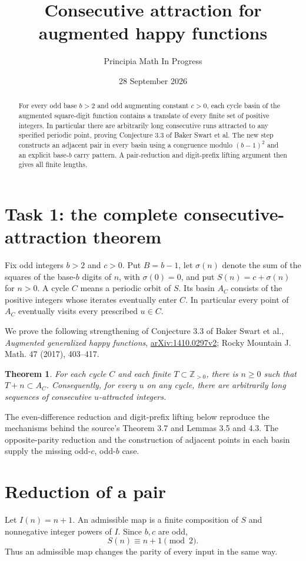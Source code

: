 \documentclass[11pt]{article}
\title{Consecutive attraction for augmented happy functions}
\author{Principia Math In Progress}
\date{28 September 2026}
\newtheorem{theorem}{Theorem}
\begin{document}
\maketitle
\begin{abstract}
For every odd base $b>2$ and odd augmenting constant $c>0$, each cycle
basin of the augmented square-digit function contains a translate of
every finite set of positive integers. In particular there are arbitrarily
long consecutive runs attracted to any specified periodic point, proving
Conjecture 3.3 of Baker Swart et al. The new step constructs an adjacent
pair in every basin using a congruence modulo $(b-1)^2$ and an explicit
base-$b$ carry pattern. A pair-reduction and digit-prefix lifting
argument then gives all finite lengths.
\end{abstract}

\section*{Task 1: the complete consecutive-attraction theorem}

Fix odd integers $b>2$ and $c>0$. Put $B=b-1$, let $\sigma(n)$ denote
the sum of the squares of the base-$b$ digits of $n$, with $\sigma(0)=0$,
and put $S(n)=c+\sigma(n)$ for $n>0$. A cycle $C$ means a periodic orbit
of $S$. Its basin $A_C$ consists of the positive integers whose iterates
eventually enter $C$. In particular every point of $A_C$ eventually
visits every prescribed $u\in C$.

We prove the following strengthening of Conjecture 3.3 of Baker Swart
et al., \emph{Augmented generalized happy functions},
\href{https://arxiv.org/abs/1410.0297}{arXiv:1410.0297v2}; Rocky Mountain
J. Math. 47 (2017), 403--417.
\begin{theorem}
For each cycle $C$ and each finite $T\subset\mathbb Z_{>0}$, there is
$n\ge0$ such that $T+n\subset A_C$. Consequently, for every $u$ on any
cycle, there are arbitrarily long sequences of consecutive $u$-attracted
integers.
\end{theorem}
The even-difference reduction and digit-prefix lifting below reproduce
the mechanisms behind the source's Theorem 3.7 and Lemmas 3.5 and 4.3.
The opposite-parity reduction and the construction of adjacent points
in each basin supply the missing odd-$c$, odd-$b$ case.

\section*{Reduction of a pair}
Let $I(n)=n+1$. An admissible map is a finite composition of $S$ and
nonnegative integer powers of $I$.
Since $b,c$ are odd,
\begin{equation}\label{parity}
S(n)\equiv n+1\pmod2.
\end{equation}
Thus an admissible map changes the parity of every input in the same way.
\end{document}
